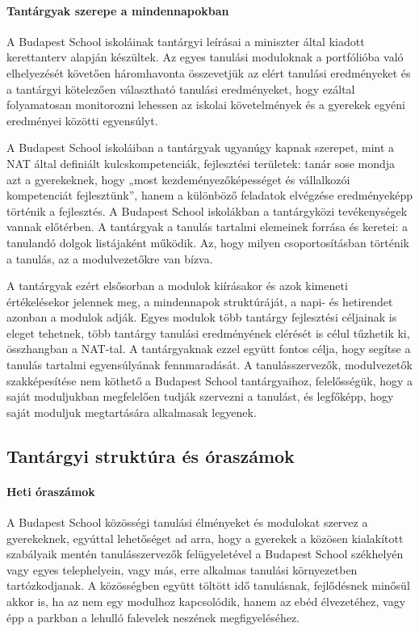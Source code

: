 \paragraph{Tantárgyak szerepe a mindennapokban}

A Budapest School iskoláinak tantárgyi leírásai a miniszter által kiadott kerettanterv alapján készültek. Az egyes tanulási moduloknak a portfólióba való elhelyezését követően háromhavonta összevetjük az elért tanulási eredményeket és  a tantárgyi kötelezően választható tanulási eredményeket, hogy ezáltal folyamatosan monitorozni lehessen az iskolai követelmények és a gyerekek egyéni eredményei közötti egyensúlyt.

A Budapest School iskoláiban a tantárgyak ugyanúgy kapnak szerepet, mint a NAT által definiált kulcskompetenciák, fejlesztési területek: tanár sose mondja azt a gyerekeknek, hogy „most kezdeményezőképességet és vállalkozói kompetenciát fejlesztünk'', hanem a különböző feladatok elvégzése eredményeképp történik a fejlesztés. A Budapest School iskolákban a tantárgyközi tevékenységek vannak előtérben. A tantárgyak a tanulás tartalmi elemeinek forrása és keretei: a tanulandó dolgok listájaként működik. Az, hogy milyen csoportosításban történik a tanulás, az a modulvezetőkre van bízva.

A tantárgyak ezért elsősorban a modulok kiírásakor és azok kimeneti értékelésekor jelennek meg, a mindennapok struktúráját, a napi- és hetirendet azonban a modulok adják. Egyes modulok több tantárgy fejlesztési céljainak is eleget tehetnek, több tantárgy tanulási eredményének elérését is célul tűzhetik ki, összhangban a NAT-tal. A tantárgyaknak ezzel együtt fontos célja, hogy segítse a tanulás tartalmi egyensúlyának fennmaradását. A tanulásszervezők, modulvezetők szakképesítése nem köthető a Budapest School tantárgyaihoz, felelősségük, hogy a saját moduljukban megfelelően tudják szervezni a tanulást, és legfőképp, hogy saját moduljuk megtartására alkalmasak legyenek.

\subsection{Tantárgyi struktúra és óraszámok}

\paragraph{Heti óraszámok} 
A Budapest School közösségi tanulási élményeket és modulokat szervez a gyerekeknek, egyúttal lehetőséget ad arra, hogy a gyerekek a közösen kialakított szabályaik mentén tanulásszervezők felügyeletével a Budapest School székhelyén vagy egyes telephelyein, vagy más, erre alkalmas tanulási környezetben tartózkodjanak. A közösségben együtt töltött idő tanulásnak, fejlődésnek minősül akkor is, ha az nem egy modulhoz kapcsolódik, hanem az ebéd élvezetéhez, vagy épp a parkban a lehulló falevelek neszének megfigyeléséhez.

